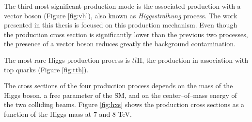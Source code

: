 The third most significant production mode is the associated production with a vector boson (Figure \ref{fig:vh}), also known as \emph{Higgsstralhung} process. The work presented in this thesis is focused on this production mechanism. Even though the production cross section is significantly lower than the previous two processes, the presence of a vector boson reduces greatly the background contamination. %

The most rare Higgs production process is $t\bar{t}$H, the production in association with top quarks (Figure \ref{fig:tth}).

The cross sections of the four production process depends on the mass of the Higgs boson, a free parameter of the SM, and on the center--of--mass energy of the two colliding beams. Figure \ref{fig:hxs} shows the production cross sections as a function of the Higgs mass at 7 and 8 TeV.

